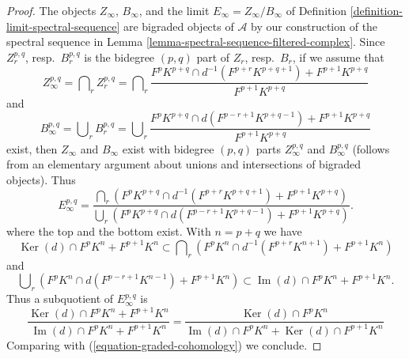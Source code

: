 \documentclass[10pt,a4paper]{amsart}
\theoremstyle{plain}
\theoremstyle{definition}
\theoremstyle{remark}
\numberwithin{equation}{subsection}
\def\Ker{\mathop{\mathrm{Ker}}}
\def\Im{\mathop{\mathrm{Im}}}
\begin{document}
\begin{proof}
The objects $Z_\infty$, $B_\infty$, and the limit
$E_\infty = Z_\infty/B_\infty$ of
Definition \ref{definition-limit-spectral-sequence}
are bigraded objects of $\mathcal{A}$ by our construction of the
spectral sequence in Lemma \ref{lemma-spectral-sequence-filtered-complex}.
Since $Z_r^{p, q}$, resp.\ $B_r^{p, q}$ is the bidegree $(p, q)$
part of $Z_r$, resp.\ $B_r$, if we assume that
$$
Z_\infty^{p, q} = \bigcap\nolimits_r Z_r^{p, q} =
\bigcap\nolimits_r
\frac{F^pK^{p + q} \cap d^{-1}(F^{p + r}K^{p + q + 1}) + F^{p + 1}K^{p + q}}
{F^{p + 1}K^{p + q}}
$$
and
$$
B_\infty^{p, q} = \bigcup\nolimits_r B_r^{p, q} =
\bigcup\nolimits_r
\frac{F^pK^{p + q} \cap d(F^{p - r + 1}K^{p + q - 1}) + F^{p + 1}K^{p + q}}
{F^{p + 1}K^{p + q}}
$$
exist, then $Z_\infty$ and $B_\infty$ exist with bidegree $(p, q)$
parts $Z_\infty^{p, q}$ and $B_\infty^{p, q}$ (follows from an elementary
argument about unions and intersections of bigraded objects). Thus
$$
E_\infty^{p, q} =
\frac{\bigcap_r (F^pK^{p + q} \cap d^{-1}(F^{p + r}K^{p + q + 1})
+ F^{p + 1}K^{p + q})}
{\bigcup_r (F^pK^{p + q} \cap d(F^{p - r + 1}K^{p + q - 1})
+ F^{p + 1}K^{p + q})}.
$$
where the top and the bottom exist. With $n = p + q$ we have
\begin{equation}
\label{equation-on-top-bigraded}
\Ker(d) \cap F^pK^{n} + F^{p + 1}K^{n}
\subset
\bigcap\nolimits_r
\left(
F^pK^{n} \cap d^{-1}(F^{p + r}K^{n + 1}) + F^{p + 1}K^{n}
\right)
\end{equation}
and
\begin{equation}
\label{equation-at-bottom-bigraded}
\bigcup\nolimits_r
\left(
F^pK^{n} \cap d(F^{p - r + 1}K^{n - 1}) + F^{p + 1}K^{n}
\right)
\subset
\Im(d) \cap F^pK^{n} + F^{p + 1}K^{n}.
\end{equation}
Thus a subquotient of $E_\infty^{p, q}$ is
$$
\frac{\Ker(d) \cap F^pK^{n} + F^{p + 1}K^n}
{\Im(d) \cap F^pK^{n} + F^{p + 1}K^{n}} =
\frac{\Ker(d) \cap F^pK^n}{\Im(d) \cap F^pK^n + \Ker(d) \cap F^{p + 1}K^n}
$$
Comparing with (\ref{equation-graded-cohomology}) we conclude.
\end{proof}
\end{document}
